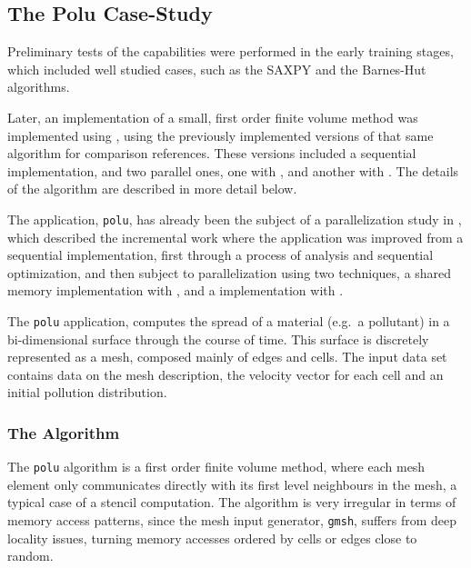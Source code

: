 \documentclass[main.tex]{subfiles}
\begin{document}
\subsection{The Polu Case-Study}

Preliminary tests of the \gama capabilities were performed in the early training stages, which included well studied cases, such as the SAXPY and the Barnes-Hut algorithms.

Later, an implementation of a small, first order finite volume method was implemented using \gama, using the previously implemented versions of that same algorithm for comparison references. These versions included a sequential implementation, and two parallel ones, one with \openmp, and another with \cuda. The details of the algorithm are described in more detail below.

The application, \texttt{polu}, has already been the subject of a parallelization study in \cite{naps2012}, which described the incremental work where the application was improved from a sequential implementation, first through a process of analysis and sequential optimization, and then subject to parallelization using two techniques, a shared memory \cpu implementation with \openmp, and a \gpu implementation with \cuda.

The \texttt{polu} application, computes the spread of a material (e.g.\ a pollutant) in a bi-dimensional surface through the course of time. This surface is discretely represented as a mesh, composed mainly of edges and cells. The input data set contains data on the mesh description, the velocity vector for each cell and an initial pollution distribution.

\subsubsection{The Algorithm} \label{sec:polu:alg}

The \texttt{polu} algorithm is a first order finite volume method, where each mesh element only communicates directly with its first level neighbours in the mesh, a typical case of a stencil computation. The algorithm is very irregular in terms of memory access patterns, since the mesh input generator, \texttt{gmsh}, suffers from deep locality issues, turning memory accesses ordered by cells or edges close to random.
\end{document}

